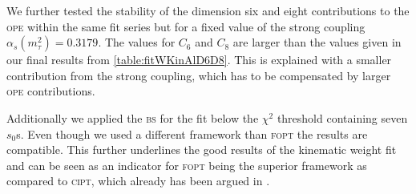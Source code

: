 \documentclass[../../index.tex]{subfiles}
\begin{document}
We further tested the stability of the dimension six and eight contributions to
the \textsc{ope} within the same fit series but for a fixed value of the strong
coupling \(\alpha_s(m_\tau^2)=0.3179\). The values for \(C_6\) and \(C_8\) are
larger than the values given in our final results from
\cref{table:fitWKinAlD6D8}. This is explained with a smaller contribution from
the strong coupling, which has to be compensated by larger \textsc{ope}
contributions.

Additionally we applied the \textsc{bs} for the fit below the \(\chi^2\)
threshold containing seven \(s_0\)s. Even though we used a different framework
than \textsc{fopt} the results are compatible. This further underlines the good
results of the kinematic weight fit and can be seen as an indicator for
\textsc{fopt} being the superior framework as compared to \textsc{cipt}, which
already has been argued in \cite{Beneke2008}.
\end{document}
